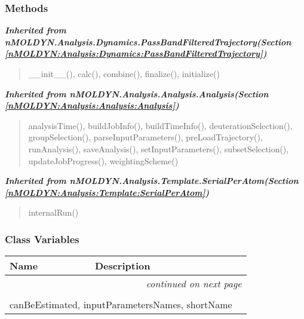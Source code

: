 
  \subsubsection{Methods}


\large{\textbf{\textit{Inherited from nMOLDYN.Analysis.Dynamics.PassBandFilteredTrajectory\textit{(Section \ref{nMOLDYN:Analysis:Dynamics:PassBandFilteredTrajectory})}}}}

\begin{quote}
\_\_init\_\_(), calc(), combine(), finalize(), initialize()
\end{quote}

\large{\textbf{\textit{Inherited from nMOLDYN.Analysis.Analysis.Analysis\textit{(Section \ref{nMOLDYN:Analysis:Analysis:Analysis})}}}}

\begin{quote}
analysisTime(), buildJobInfo(), buildTimeInfo(), deuterationSelection(), groupSelection(), parseInputParameters(), preLoadTrajectory(), runAnalysis(), saveAnalysis(), setInputParameters(), subsetSelection(), updateJobProgress(), weightingScheme()
\end{quote}

\large{\textbf{\textit{Inherited from nMOLDYN.Analysis.Template.SerialPerAtom\textit{(Section \ref{nMOLDYN:Analysis:Template:SerialPerAtom})}}}}

\begin{quote}
internalRun()
\end{quote}


  \subsubsection{Class Variables}

    \vspace{-1cm}
\hspace{\varindent}\begin{longtable}{|p{\varnamewidth}|p{\vardescrwidth}|l}
\cline{1-2}
\cline{1-2} \centering \textbf{Name} & \centering \textbf{Description}& \\
\cline{1-2}
\endhead\cline{1-2}\multicolumn{3}{r}{\small\textit{continued on next page}}\\\endfoot\cline{1-2}
\endlastfoot\multicolumn{2}{|l|}{\textit{Inherited from nMOLDYN.Analysis.Dynamics.PassBandFilteredTrajectory \textit{(Section \ref{nMOLDYN:Analysis:Dynamics:PassBandFilteredTrajectory})}}}\\
\multicolumn{2}{|p{\varwidth}|}{\raggedright canBeEstimated, inputParametersNames, shortName}\\
\cline{1-2}
\end{longtable}

